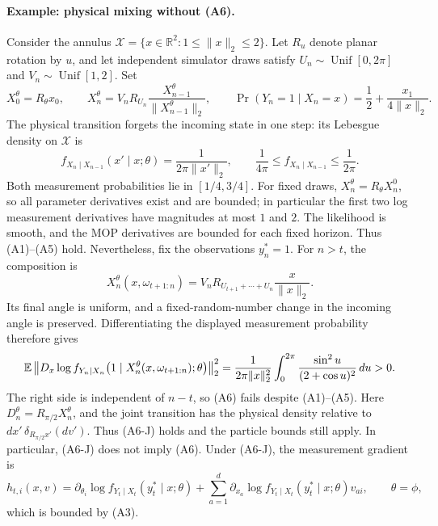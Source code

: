 \documentclass[11pt]{article}
\theoremstyle{thmstylethree}%
\begin{document}
{\paragraph*{Example: physical mixing without (A6).}
Consider the annulus $\mathcal X=\{x\in\mathbb R^2:1\leq\|x\|_2\leq2\}$.
Let $R_u$ denote planar rotation by $u$, and let independent simulator
draws satisfy $U_n\sim\operatorname{Unif}[0,2\pi]$ and
$V_n\sim\operatorname{Unif}[1,2]$. Set
\begin{equation}
X_0^\theta=R_\theta x_0,\qquad
X_n^\theta=V_n R_{U_n}\frac{X_{n-1}^\theta}{\|X_{n-1}^\theta\|_2},
\qquad
\Pr(Y_n=1\mid X_n=x)=\frac12+\frac{x_1}{4\|x\|_2}.
\label{eq:gradient-stability-rotation-example}
\end{equation}
The physical transition forgets the incoming state in one step: its
Lebesgue density on $\mathcal X$ is
\begin{equation}
f_{X_n\mid X_{n-1}}(x'\mid x;\theta)=\frac{1}{2\pi\|x'\|_2},
\qquad \frac1{4\pi}\leq f_{X_n\mid X_{n-1}}\leq\frac1{2\pi}.
\end{equation}
Both measurement probabilities lie in $[1/4,3/4]$.
For fixed draws, $X_n^\theta=R_\theta X_n^0$, so all parameter
derivatives exist and are bounded; in particular the first two log
measurement derivatives have magnitudes at most $1$ and $2$.
The likelihood is smooth, and the MOP derivatives are bounded for each
fixed horizon. Thus (A1)--(A5) hold.
\endgraf
Nevertheless, fix the observations $y_n^*=1$. For $n>t$, the composition is
\begin{equation}
X_n^\theta(x,\omega_{t+1:n})
=V_nR_{U_{t+1}+\cdots+U_n}\frac{x}{\|x\|_2}.
\end{equation}
Its final angle is uniform, and a fixed-random-number change in the
incoming angle is preserved. Differentiating the displayed measurement
probability therefore gives
\begin{equation}
\mathbb{E}\left\|D_x\log f_{Y_n\mid X_n}
\bigl(1\mid X_n^\theta(x,\omega_{t+1:n});\theta\bigr)\right\|_2^2
=\frac{1}{2\pi\|x\|_2^2}
\int_0^{2\pi}\frac{\sin^2 u}{(2+\cos u)^2}\,du>0.
\label{eq:gradient-stability-rotation-nondecay}
\end{equation}
The right side is independent of $n-t$, so (A6) fails despite (A1)--(A5).
Here $D_n^\theta=R_{\pi/2}X_n^\theta$, and the joint transition has the
physical density relative to $dx'\,\delta_{R_{\pi/2}x'}(dv')$.
Thus (A6-J) holds and the particle bounds still apply. In particular,
(A6-J) does not imply (A6).
\endgraf
Under (A6-J), the measurement gradient is
\begin{equation}
h_{t,i}(x,v)=\partial_{\theta_i}\log f_{Y_t\mid X_t}(y_t^*\mid x;\theta)
+\sum_{a=1}^d\partial_{x_a}\log f_{Y_t\mid X_t}(y_t^*\mid x;\theta)v_{ai},
\qquad \theta=\phi,
\label{eq:joint-current-measurement-gradient}
\end{equation}
which is bounded by (A3).
}
\end{document}
